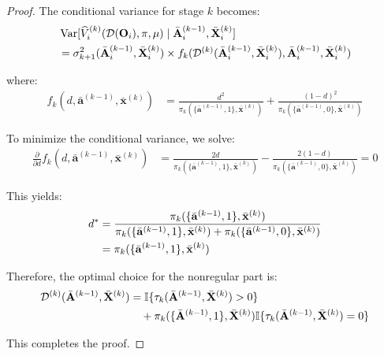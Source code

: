 \documentclass[11pt]{article}
\theoremstyle{referenceplain}
\theoremstyle{referencedefinition}
\theoremstyle{referenceremark}
\begin{document}
\begin{proof}
The conditional variance for stage $k$ becomes:
\begin{align}
    &\operatorname{Var}[\widehat{V}_i^{(k)}(\mathcal{D}(\mathbf{O}_i),\pi,\mu) \mid \bar{\mathbf{A}}_i^{(k-1)}, \bar{\mathbf{X}}_i^{(k)}]\notag\\
    &= \sigma^2_{k+1}(\bar{\mathbf{A}}_i^{(k-1)}, \bar{\mathbf{X}}_i^{(k)}) \times f_k(\mathcal{D}^{(k)}(\bar{\mathbf{A}}_i^{(k-1)},\bar{\mathbf{X}}_i^{(k)}), \bar{\mathbf{A}}_i^{(k-1)}, \bar{\mathbf{X}}_i^{(k)})
\end{align}

where:
\begin{align}
    f_k(d, \bar{\mathbf{a}}^{(k-1)}, \bar{\mathbf{x}}^{(k)}) &= \frac{d^2}{\pi_k(\{\bar{\mathbf{a}}^{(k-1)},1\}, \bar{\mathbf{x}}^{(k)})} + \frac{(1-d)^2}{\pi_k(\{\bar{\mathbf{a}}^{(k-1)},0\}, \bar{\mathbf{x}}^{(k)})}
\end{align}

To minimize the conditional variance, we solve:
\begin{align}
    \frac{\partial}{\partial d} f_k(d, \bar{\mathbf{a}}^{(k-1)}, \bar{\mathbf{x}}^{(k)}) &= \frac{2d}{\pi_k(\{\bar{\mathbf{a}}^{(k-1)},1\}, \bar{\mathbf{x}}^{(k)})} - \frac{2(1-d)}{\pi_k(\{\bar{\mathbf{a}}^{(k-1)},0\}, \bar{\mathbf{x}}^{(k)})} = 0
\end{align}

This yields:
\begin{align}
    d^* &= \frac{\pi_k(\{\bar{\mathbf{a}}^{(k-1)},1\}, \bar{\mathbf{x}}^{(k)})}{\pi_k(\{\bar{\mathbf{a}}^{(k-1)},1\}, \bar{\mathbf{x}}^{(k)}) + \pi_k(\{\bar{\mathbf{a}}^{(k-1)},0\}, \bar{\mathbf{x}}^{(k)})}\notag\\
    &= \pi_k(\{\bar{\mathbf{a}}^{(k-1)},1\}, \bar{\mathbf{x}}^{(k)})
\end{align}

Therefore, the optimal choice for the nonregular part is:
\begin{align}
    \mathcal{D}^{(k)}(\bar{\mathbf{A}}^{(k-1)},\bar{\mathbf{X}}^{(k)}) &= \mathbb{I}\{\tau_k(\bar{\mathbf{A}}^{(k-1)},\bar{\mathbf{X}}^{(k)}) > 0\}\notag\\
    &\quad + \pi_k(\{\bar{\mathbf{A}}^{(k-1)},1\}, \bar{\mathbf{X}}^{(k)}) \mathbb{I}\{\tau_k(\bar{\mathbf{A}}^{(k-1)},\bar{\mathbf{X}}^{(k)}) = 0\}
\end{align}

This completes the proof.
\end{proof}
\end{document}
